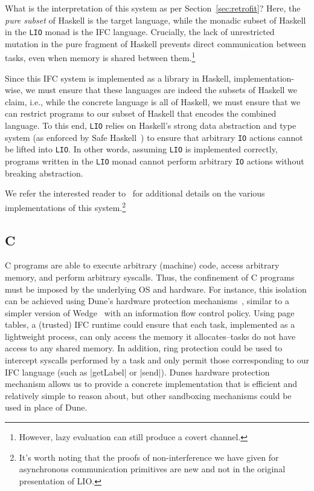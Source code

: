 What is the interpretation of this system as per Section~\ref{sec:retrofit}?
%
Here, the \emph{pure subset} of Haskell is the target language, while
the monadic subset of Haskell in the \verb|LIO| monad is the IFC
language.
%
Crucially, the lack of unrestricted mutation in the pure fragment of
Haskell prevents direct communication between tasks, even when memory is
shared between them.\footnote{However, lazy evaluation can still produce
a covert channel.}

Since this IFC system is implemented as a library in Haskell,
implementation-wise, we must ensure that these languages are indeed the subsets of Haskell
we claim, i.e., while the concrete language is all of Haskell, we must
ensure that we can restrict programs to our subset of Haskell that
encodes the combined language.
%
To this end, \verb|LIO| relies on Haskell's strong data abstraction and type system
(as enforced by Safe Haskell~\cite{Terei:2012:SH:2364506.2364524}) to
ensure that arbitrary \verb|IO| actions cannot be lifted into
\verb|LIO|.
%
In other words, assuming \verb|LIO| is implemented correctly, programs
written in the \verb|LIO| monad cannot perform arbitrary \verb|IO| actions
without breaking abstraction.

We refer the interested reader to~\cite{lio,stefan:addressing-covert} for
additional details on the various implementations of this system.\footnote{It's worth noting that the proofs of non-interference we have given for asynchronous communication primitives are new and not in the original presentation of LIO.}


\subsection{C}
\label{sec:real:c}
%
C programs are able to execute arbitrary (machine) code, access
arbitrary memory, and perform arbitrary syscalls.
%
Thus, the confinement of C programs must be imposed by the underlying OS
and hardware.
%
For instance, this isolation can be achieved using Dune's hardware protection
mechanisms~\cite{Belay:2012:DSU:2387880.2387913}, similar to a simpler
version of Wedge~\cite{Belay:2012:DSU:2387880.2387913,
Bittau:2008:WSA:1387589.1387611} with an information flow control
policy.
%
Using page tables, a (trusted) IFC runtime could ensure that each task,
implemented as a lightweight process, can only access the memory it
allocates--tasks do not have access to any shared memory.
%
In addition, ring protection could be used to intercept syscalls performed by
a task and only permit those corresponding to our IFC language (such as
|getLabel| or |send|).
%
Dunes hardware protection mechanism allows us to provide a concrete
implementation that is efficient and relatively simple to reason
about, but other sandboxing mechanisms could be used in place of Dune.


